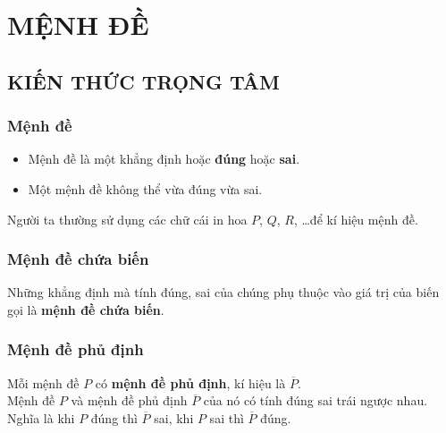 \setcounter{section}{0}
\def\tenchude{MỆNH ĐỀ}
\section{MỆNH ĐỀ}

\subsection{KIẾN THỨC TRỌNG TÂM}
\subsubsection{Mệnh đề}
\begin{khung4}{}
	\begin{itemize}
		\item Mệnh đề là một khẳng định hoặc \textbf{đúng} hoặc \textbf{sai}.
		\item Một mệnh đề không thể vừa đúng vừa sai.
	\end{itemize}
\end{khung4}
\begin{note}
	 Người ta thường sử dụng các chữ cái in hoa $P$, $Q$, $R$, \ldots  để kí hiệu mệnh đề.
\end{note}
\subsubsection{Mệnh đề chứa biến}
\begin{khung4}{}
	Những khẳng định mà tính đúng, sai của chúng phụ thuộc vào giá trị của biến gọi là \textbf{mệnh đề chứa biến}.
\end{khung4}
\subsubsection{Mệnh đề phủ định}
\begin{khung4}{}
	Mỗi mệnh đề $P$ có \textbf{mệnh đề phủ định}, kí hiệu là $\overline{P}$.\\
	Mệnh đề $P$ và mệnh đề phủ định $\overline{P}$ của nó có tính đúng sai trái ngược nhau. \\Nghĩa là khi $P$ đúng thì $\overline{P}$ sai, khi $P$ sai thì $\overline{P}$ đúng.
\end{khung4}
